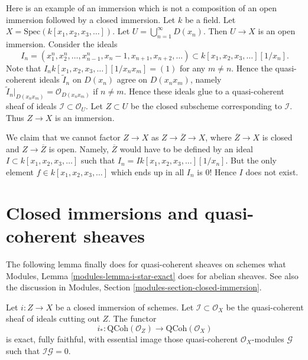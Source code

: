 \begin{example}
\label{example-thibaut}
Here is an example of an immersion which is not a composition of an
open immersion followed by a closed immersion.
Let $k$ be a field.
Let $X = \text{Spec}(k[x_1, x_2, x_3, \ldots])$.
Let $U = \bigcup_{n = 1}^{\infty} D(x_n)$.
Then $U \to X$ is an open immersion.
Consider the ideals
$$
I_n =
(x_1^n, x_2^n, \ldots, x_{n - 1}^n, x_n - 1, x_{n + 1}, x_{n + 2}, \ldots)
\subset
k[x_1, x_2, x_3, \ldots][1/x_n].
$$
Note that $I_n k[x_1, x_2, x_3, \ldots][1/x_nx_m] = (1)$
for any $m \not = n$. Hence the quasi-coherent ideals
$\widetilde I_n$ on $D(x_n)$ agree on $D(x_nx_m)$, namely
$\widetilde I_n|_{D(x_nx_m)} = \mathcal{O}_{D(x_n x_m)}$ if
$n \not = m$. Hence these ideals glue to a quasi-coherent sheaf of ideals
$\mathcal{I} \subset \mathcal{O}_U$.
Let $Z \subset U$ be the closed subscheme corresponding to
$\mathcal{I}$. Thus $Z \to X$ is an immersion.

\medskip\noindent
We claim that we cannot factor $Z \to X$ as
$Z \to \overline{Z} \to X$, where $\overline{Z} \to X$ is closed
and $Z \to \overline{Z}$ is open. Namely, $\overline{Z}$ would
have to be defined by an ideal $I \subset k[x_1, x_2, x_3, \ldots]$
such that $I_n = I k[x_1, x_2, x_3, \ldots][1/x_n]$.
But the only element $f \in k[x_1, x_2, x_3, \ldots]$
which ends up in all $I_n$ is $0$! Hence $I$ does not exist.
\end{example}








\section{Closed immersions and quasi-coherent sheaves}
\label{section-closed-immersions-quasi-coherent}

\noindent
The following lemma finally does for quasi-coherent sheaves on schemes
what Modules, Lemma \ref{modules-lemma-i-star-exact} does for abelian sheaves.
See also the discussion in
Modules, Section \ref{modules-section-closed-immersion}.

\begin{lemma}
\label{lemma-i-star-equivalence}
Let $i : Z \to X$ be a closed immersion of schemes. Let
$\mathcal{I} \subset \mathcal{O}_X$ be the quasi-coherent sheaf of ideals
cutting out $Z$. The functor
$$
i_* :
\text{QCoh}(\mathcal{O}_Z)
\longrightarrow
\text{QCoh}(\mathcal{O}_X)
$$
is exact, fully faithful, with essential image those quasi-coherent
$\mathcal{O}_X$-modules $\mathcal{G}$ such that $\mathcal{I}\mathcal{G} = 0$.
\end{lemma}


